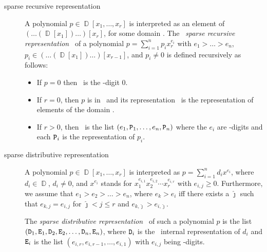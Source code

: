 \begin{description}
\item[sparse recursive representation]
  A polynomial $p \in \BbbD[x_1,\ldots,x_r]$ is interpreted as an element
  of $(\ldots(\BbbD[x_1])\ldots)[x_r]$, for some domain \BbbD. The \saclib\
  {\em sparse recursive representation} \ttP\ of a polynomial $p =
  \sum_{i=1}^n p_i x_r^{e_i}$ with $e_1 > \ldots > e_n$, $p_i \in
  (\ldots(\BbbD[x_1])\ldots)[x_{r-1}]$, and $p_i \neq 0$ is defined
  recursively as follows:
  \begin{itemize}
  \item
    If $p = 0$ then \ttP\ is the \BETA-digit 0.
  \item
    If $r = 0$, then $p$ is in \BbbD\ and its representation \ttP\ is the
    representation of elements of the domain \BbbD.
  \item
    If $r > 0$, then \ttP\ is the list $(e_1, {\tt P}_1,\ldots, e_n, {\tt P}_n)$
    where the $e_i$ are \BETA-digits and each ${\tt P}_i$ is the
    representation of $p_i$.
  \end{itemize}
\item[sparse distributive representation]
  A polynomial $p \in \BbbD[x_1,\ldots,x_r]$ is interpreted as $p =
  \sum_{i=1}^n d_i x^{e_i}$, where $d_i \in \BbbD$, $d_i \neq 0$, and
  $x^{e_i}$ stands for $x_1^{e_{i,1}} x_2^{e_{i,2}} \cdots x_r^{e_{i,r}}$
  with $e_{i,j} \geq 0$.
  Furthermore, we assume that $e_1 > e_2 > \ldots > e_n$, where $e_k > e_i$
  iff there exists a $\hat{\jmath}$ such that $e_{k,j} = e_{i,j}$ for
  $\hat{\jmath} < j \leq r$ and $e_{k,\hat{\jmath}} > e_{i,\hat{\jmath}}$.

  The {\em sparse distributive representation} \ttP\ of such a polynomial
  $p$ is the list $({\tt D}_1, {\tt E}_1, {\tt D}_2, {\tt E}_2,\ldots, {\tt D}_n,
  {\tt E}_n)$, where ${\tt D}_i$ is the \saclib\ internal representation of $d_i$
  and ${\tt E}_i$ is the list $(e_{i,r}, e_{i,r-1},\ldots, e_{i,1})$ with
  $e_{i,j}$ being \BETA-digits.


\end{description}
